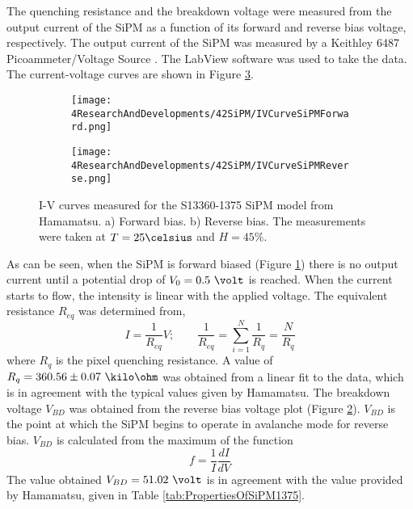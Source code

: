 The quenching resistance and the breakdown voltage were measured from the output current of the SiPM as a function of its forward and reverse bias voltage, respectively. The output current of the SiPM was measured by a Keithley 6487 Picoammeter/Voltage Source \cite{DataSheetKeithley6487}. The LabView software was used to take the data. The current-voltage curves are shown in Figure \ref{fig:IVcurveSiPM}.
\begin{figure}
\centering
    \begin{subfigure}[b]{0.9\textwidth}
    \centering
    \texttt{[image: 4ResearchAndDevelopments/42SiPM/IVCurveSiPMForward.png]}  
    \caption{\label{subfig:IVcurveForward}}
    \end{subfigure}
    \hfill
    \begin{subfigure}[b]{0.9\textwidth}
    \centering
    \texttt{[image: 4ResearchAndDevelopments/42SiPM/IVCurveSiPMReverse.png]}  
    \caption{\label{subfig:IVcurveReverse}}
    \end{subfigure}
 \caption{I-V curves measured for the S13360-1375 SiPM model from Hamamatsu. a) Forward bias. b) Reverse bias. The measurements were taken at $T=25\celsius$ and $H=45\%$.}
 \label{fig:IVcurveSiPM}
\end{figure}
As can be seen, when the SiPM is forward biased (Figure \ref{subfig:IVcurveForward}) there is no output current until a potential drop of $V_0= 0.5~\volt$ is reached. When the current starts to flow, the intensity is linear with the applied voltage. The equivalent resistance $R_{eq}$ was determined from, 
\begin{equation}
I=\frac{1}{R_{eq}}V;  \qquad \frac{1}{R_{eq}} = \sum_{i=1}^{N}\frac{1}{R_{q}}= \frac{N}{R_{q}}
\label{QuenchingResistance}
\end{equation}
where $R_{q}$ is the pixel quenching resistance. A value of $R_{q}= 360.56 \pm 0.07~\kilo\ohm$ was obtained from a linear fit to the data, which is in agreement with the typical values given by Hamamatsu. The breakdown voltage $V_{BD}$ was obtained from the reverse bias voltage plot (Figure \ref{subfig:IVcurveReverse}). $V_{BD}$ is the point at which the SiPM begins to operate in avalanche mode for reverse bias. $V_{BD}$ is calculated from the maximum of the function 
\begin{equation}
f=\frac{1}{I}\frac{dI}{dV}
\label{BreakDownVoltageFunction}
\end{equation}
The value obtained $V_{BD}=51.02~\volt$ is in agreement with the value provided by Hamamatsu, given in Table \ref{tab:PropertiesOfSiPM1375}.

